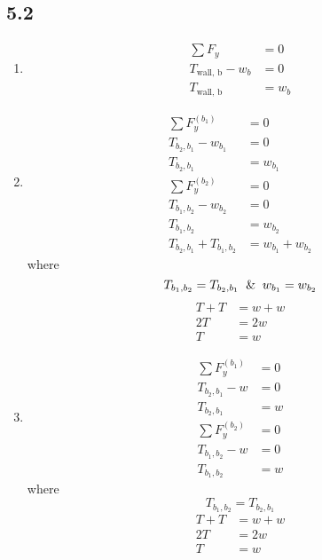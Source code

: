 \documentclass{article}
\begin{document}
\subsection{5.2}
\begin{enumerate}[label=\textbf{(\alph*)}]
	\item
		\begin{align*}
			\sum F_y & = 0 \\
			T_\text{wall, b} - w_b & = 0 \\
			T_\text{wall, b} & = w_b
		\end{align*}

	\item
		\begin{align*}
			\sum F_y^{(b_1)} & = 0 \\
			T_{b_2,b_1} - w_{b_1} & = 0 \\
			T_{b_2,b_1} & = w_{b_1} \\
			\sum F_y^{(b_2)} & = 0 \\
			T_{b_1,b_2} - w_{b_2} & = 0 \\
			T_{b_1,b_2} & = w_{b_2} \\
			T_{b_2,b_1} + T_{b_1,b_2} & = w_{b_1} + w_{b_2}
		\end{align*}
		where $$ T_{b_1,b_2} = T_{b_2,b_1} \And w_{b_1} = w_{b_2} $$
		\begin{align*}
			T + T & = w + w \\
			2T & = 2w \\
			T & = w
		\end{align*}

	\item
		\begin{align*}
			\sum F_y^{(b_1)} & = 0 \\
			T_{b_2,b_1} - w & = 0 \\
			T_{b_2,b_1} & = w \\
			\sum F_y^{(b_2)} & = 0 \\
			T_{b_1,b_2} - w & = 0 \\
			T_{b_1,b_2} & = w
		\end{align*}
		where $$ T_{b_1,b_2} = T_{b_2,b_1} $$
		\begin{align*}
			T + T & = w + w \\
			2T & = 2w \\
			T & = w
		\end{align*}
\end{enumerate}
\end{document}

